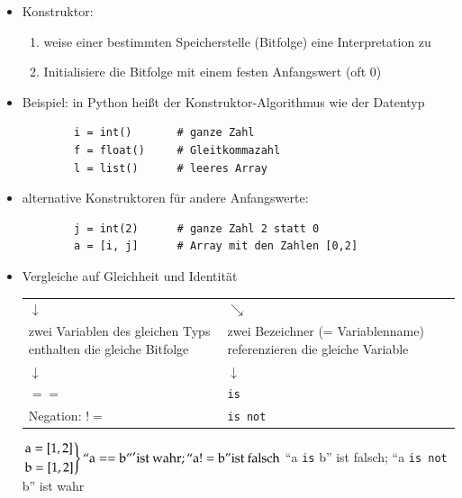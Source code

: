\documentclass[11pt, fleqn]{scrreprt}
\begin{document}
\begin{itemize}[label={$\bullet$}]
    \item Konstruktor:
    \begin{enumerate}
        \item weise einer bestimmten Speicherstelle (Bitfolge) eine Interpretation zu
        \item Initialisiere die Bitfolge mit einem festen Anfangswert (oft 0)
    \end{enumerate}
    \item[] Beispiel: in Python heißt der Konstruktor-Algorithmus wie der Datentyp \\
    \begin{verbatim}
        i = int()       # ganze Zahl
        f = float()     # Gleitkommazahl
        l = list()      # leeres Array
    \end{verbatim}
    \item[] alternative Konstruktoren für andere Anfangswerte:
    \begin{verbatim}
        j = int(2)      # ganze Zahl 2 statt 0
        a = [i, j]      # Array mit den Zahlen [0,2]
    \end{verbatim}

    \item Vergleiche auf Gleichheit und Identität \\
    \begin{tabular}{C{7cm} C{7cm}}
    $\downarrow$ & $\searrow$ \\
    zwei Variablen des gleichen Typs enthalten die gleiche Bitfolge & zwei Bezeichner (= Variablenname) referenzieren die gleiche Variable \\
    $\downarrow$ & $\downarrow$ \\
    $==$ & \verb|is| \\
    Negation: $!=$ & \verb|is not| \\
    \end{tabular}

    $\begin{rcases}
    \text{a} = [1,2] \\
    \text{b} = [1,2]
    \end{rcases}
    \text{``a} == \text{b''}' \text{ist wahr}; \text{``a} != \text{b''} \text{ist falsch} $ \hspace*{0.6cm}
    ``a \verb|is|  b'' ist falsch; ``a \verb|is not| b'' ist wahr \\


\end{itemize}
\end{document}
